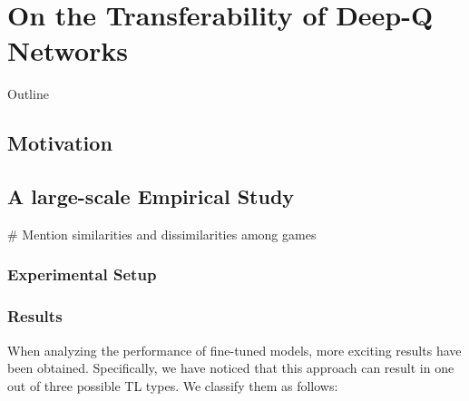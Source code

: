 
\chapter{On the Transferability of Deep-Q Networks} %
\label{ch:dqn_transfer} %

\begin{remark}{Outline}
\end{remark}




\section{Motivation}


\section{A large-scale Empirical Study}
\label{sec:empirical_study}

# Mention similarities and dissimilarities among games

\subsection{Experimental Setup}

\subsection{Results}

When analyzing the performance of fine-tuned models, more exciting results have been obtained. Specifically, we have noticed that this approach can result in one out of three possible TL types. We classify them as follows:

